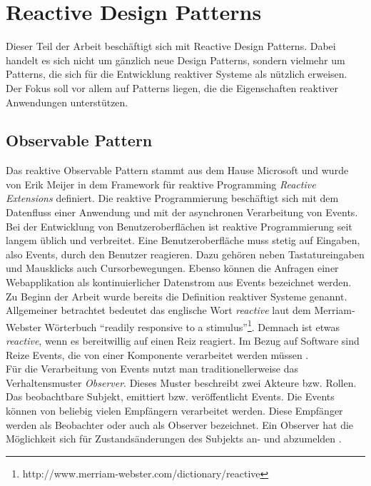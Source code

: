 \section{Reactive Design Patterns}

Dieser Teil der Arbeit beschäftigt sich mit Reactive Design Patterns. Dabei handelt es sich nicht um gänzlich neue Design Patterns, sondern vielmehr um Patterns, die sich für die Entwicklung reaktiver Systeme als nützlich erweisen. Der Fokus soll vor allem auf Patterns liegen, die die Eigenschaften reaktiver Anwendungen unterstützen.

\subsection{Observable Pattern}\label{subsec:observable-pattern}
Das reaktive Observable Pattern stammt aus dem Hause Microsoft und wurde von Erik Meijer in dem Framework für reaktive Programming \textit{Reactive Extensions} definiert. Die reaktive Programmierung beschäftigt sich mit dem Datenfluss einer Anwendung und mit der asynchronen Verarbeitung von Events. Bei der Entwicklung von Benutzeroberflächen ist reaktive Programmierung seit langem üblich und verbreitet. Eine Benutzeroberfläche muss stetig auf Eingaben, also Events, durch den Benutzer reagieren. Dazu gehören neben Tastatureingaben und Mausklicks auch Cursorbewegungen. Ebenso können die Anfragen einer Webapplikation als kontinuierlicher Datenstrom aus Events bezeichnet werden.\\
Zu Beginn der Arbeit wurde bereits die Definition reaktiver Systeme genannt. Allgemeiner betrachtet bedeutet das englische Wort \textit{reactive} laut dem Merriam-Webster Wörterbuch \enquote{readily responsive to a stimulus}\footnote{http://www.merriam-webster.com/dictionary/reactive}. Demnach ist etwas \textit{reactive}, wenn es bereitwillig auf einen Reiz reagiert. Im Bezug auf Software sind Reize Events, die von einer Komponente verarbeitet werden müssen \cite{rappl_introduction_2016} \cite[S.~4]{carkci_dataflow_2014} \cite[S.~5]{blackheath_functional_2015}.\\
Für die Verarbeitung von Events nutzt man traditionellerweise das Verhaltensmuster \textit{Observer}. Dieses Muster beschreibt zwei Akteure bzw. Rollen. Das beobachtbare Subjekt, emittiert bzw. veröffentlicht Events. Die Events können von beliebig vielen Empfängern verarbeitet werden. Diese Empfänger werden als Beobachter oder auch als Observer bezeichnet. Ein Observer hat die Möglichkeit sich für Zustandsänderungen des Subjekts an- und abzumelden \cite[S.~293]{gamma_design_1995}.\\
